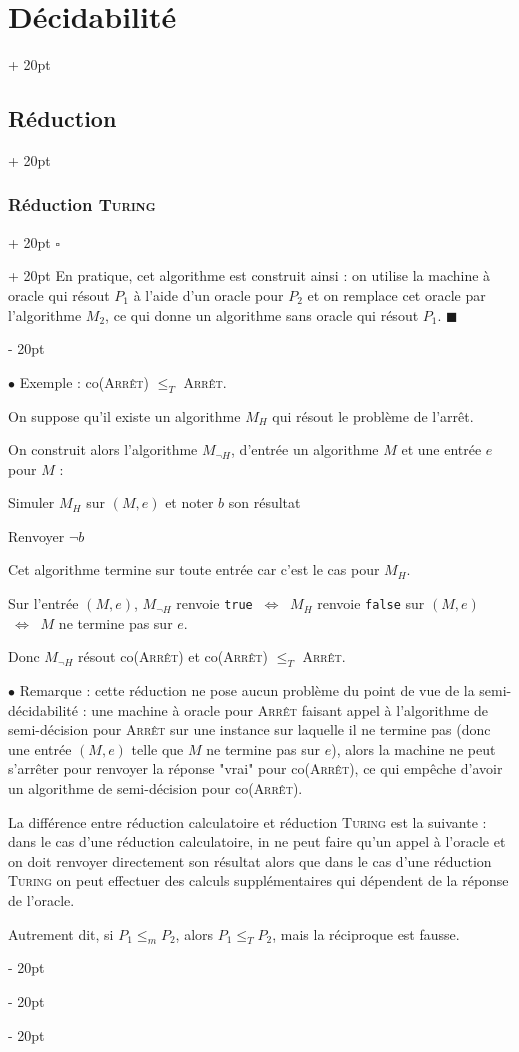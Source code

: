\documentclass[a4paper, 12pt, twoside]{article}
\newenvironment{indalgo}[2][H]{
    \begin{algoBox}
        \begin{algorithm}[#1]
            \caption{#2}
}
{
        \end{algorithm}
    \end{algoBox}
}
\newcommand{\ssi}{\ \Leftrightarrow \ }
\renewcommand{\le}{\leqslant}
\newcommand{\ind}[1][20pt]{\advance\leftskip + #1}
\newcommand{\deind}[1][20pt]{\advance\leftskip - #1}
\newenvironment{indt}[2][20pt]{#2 \par \ind[#1]}{\par \deind} %
\newenvironment{proof}[1][{}]{\begin{indt}{$\square$ #1}}{$\blacksquare$ \end{indt}}
\begin{document}
\begin{indt}{\section{Décidabilité}}
\begin{indt}{\subsection{Réduction}}
\begin{indt}{\subsubsection{Réduction \textsc{Turing}}}
\begin{proof}
                    En pratique, cet algorithme est construit ainsi : on utilise la machine à oracle qui résout $P_1$ à l'aide d'un oracle pour $P_2$ et on remplace cet oracle par l'algorithme $M_2$, ce qui donne un algorithme sans oracle qui résout $P_1$.
                \end{proof}

                \vspace{12pt}
                
                $\bullet$ Exemple : co(\textsc{Arrêt}) $\le_T$ \textsc{Arrêt}.

                On suppose qu'il existe un algorithme $M_H$ qui résout le problème de l'arrêt.

                On construit alors l'algorithme $M_{\neg H}$, d'entrée un algorithme $M$ et une entrée $e$ pour $M$ :

                \begin{indalgo}{}
                    Simuler $M_H$ sur $(M, e)$ et noter $b$ son résultat\;

                    Renvoyer $\neg b$\;
                \end{indalgo}

                Cet algorithme termine sur toute entrée car c'est le cas pour $M_H$.

                Sur l'entrée $(M, e)$, $M_{\neg H}$ renvoie \texttt{true} $\ssi$ $M_H$ renvoie \texttt{false} sur $(M, e)$ $\ssi$ $M$ ne termine pas sur $e$.

                Donc $M_{\neg H}$ résout co(\textsc{Arrêt}) et co(\textsc{Arrêt}) $\le_T$ \textsc{Arrêt}.

                \vspace{12pt}
                
                $\bullet$ Remarque : cette réduction ne pose aucun problème du point de vue de la semi-décidabilité : une machine à oracle pour \textsc{Arrêt} faisant appel à l'algorithme de semi-décision pour \textsc{Arrêt} sur une instance sur laquelle il ne termine pas (donc une entrée $(M, e)$ telle que $M$ ne termine pas sur $e$), alors la machine ne peut s'arrêter pour renvoyer la réponse "vrai" pour co(\textsc{Arrêt}), ce qui empêche d'avoir un algorithme de semi-décision pour co(\textsc{Arrêt}).

                La différence entre réduction calculatoire et réduction \textsc{Turing} est la suivante : dans le cas d'une réduction calculatoire, in ne peut faire qu'un appel à l'oracle et on doit renvoyer directement son résultat alors que dans le cas d'une réduction \textsc{Turing} on peut effectuer des calculs supplémentaires qui dépendent de la réponse de l'oracle.

                Autrement dit, si $P_1 \le_m P_2$, alors $P_1 \le_T P_2$, mais la réciproque est fausse.
            \end{indt}
        \end{indt}
    \end{indt}
\end{document}
